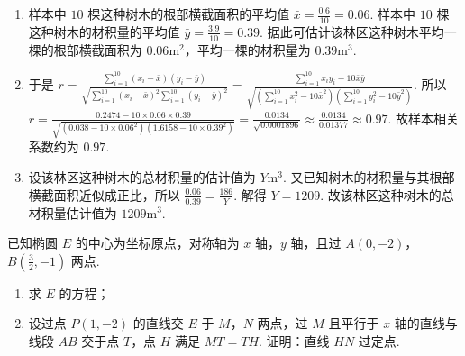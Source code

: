 \begin{solution}
\begin{enumerate}
\item 样本中 \(10\) 棵这种树木的根部横截面积的平均值
\(\bar{x}=\frac{0.6}{10}=0.06\).
样本中 \(10\) 棵这种树木的材积量的平均值
\(\bar{y}=\frac{3.9}{10}=0.39\).
据此可估计该林区这种树木平均一棵的根部横截面积为 \(0.06\mathrm{m}^2\)，平均一棵的材积量为 \(0.39\mathrm{m}^3\).

\item
于是 \(r=\frac{\sum_{i=1}^{10}\left( x_i-\bar{x} \right)\left( y_i-\bar{y} \right)}{\sqrt{\sum_{i=1}^{10}\left( x_i-\bar{x} \right)^2\sum_{i=1}^{10}\left( y_i-\bar{y} \right)^2}}=\frac{\sum_{i=1}^{10}x_iy_i-10\bar{x}\bar{y}}{\sqrt{\left( \sum_{i=1}^{10}x_i^2-10\bar{x}^2 \right)\left( \sum_{i=1}^{10}y_i^2-10\bar{y}^2 \right)}}\).
所以 \(r=\frac{0.2474-10\times 0.06\times 0.39}{\sqrt{\left( 0.038-10\times 0.06^2 \right)\left( 1.6158-10\times 0.39^2 \right)}}=\frac{0.0134}{\sqrt{0.0001896}}\approx \frac{0.0134}{0.01377}\approx 0.97\).
故样本相关系数约为 \(0.97\).

\item 设该林区这种树木的总材积量的估计值为 \(Y\mathrm{m}^3\).
又已知树木的材积量与其根部横截面积近似成正比，所以
\(\frac{0.06}{0.39}=\frac{186}{Y}\).
解得
\(Y=1209\).
故该林区这种树木的总材积量估计值为 \(1209\mathrm{m}^3\).
\end{enumerate}
\end{solution}

\begin{problem}
已知椭圆 \(E\) 的中心为坐标原点，对称轴为 \(x\) 轴，\(y\) 轴，且过 \(A(0,-2)\)，\(B\left( \frac{3}{2},-1 \right)\) 两点.
\begin{enumerate}
\item 求 \(E\) 的方程；
\item 设过点 \(P(1,-2)\) 的直线交 \(E\) 于 \(M\)，\(N\) 两点，过 \(M\) 且平行于 \(x\) 轴的直线与线段 \(AB\) 交于点 \(T\)，点 \(H\) 满足 \(MT=TH\). 证明：直线 \(HN\) 过定点.
\end{enumerate}
\end{problem}

